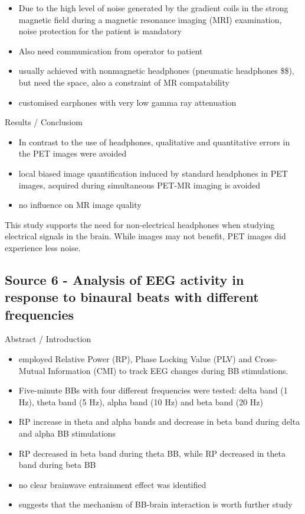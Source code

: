 \documentclass[a4paper]{article}
\begin{document}
\begin{itemize}
    \item Due to the high level of noise generated by the gradient coils in the strong magnetic field during a magnetic resonance imaging (MRI) examination, noise protection for the patient is mandatory
    \item Also need communication from operator to patient
    \item usually achieved with nonmagnetic headphones (pneumatic headphones \$\$), but need the space, also a constraint of MR compatability
    \item customised earphones with very low gamma ray attenuation
\end{itemize}

\noindent
Results / Conclusiom

\begin{itemize}
    \item In contrast to the use of headphones, qualitative and quantitative errors in the PET images were avoided
    \item local biased image quantification induced by standard headphones in PET images, acquired during simultaneous PET-MR imaging is avoided
    \item no influence on MR image quality
\end{itemize}

This study supports the need for non-electrical headphones when studying electrical signals in the brain. While images may not benefit, PET images did experience less noise.

\subsection*{Source 6 - Analysis of EEG activity in response to binaural beats with different frequencies}

\noindent
Abstract / Introduction
\begin{itemize}
    \item employed Relative Power (RP), Phase Locking Value (PLV) and Cross-Mutual Information (CMI) to track EEG changes during BB stimulations.
    \item Five-minute BBs with four different frequencies were tested: delta band (1 Hz), theta band (5 Hz), alpha band (10 Hz) and beta band (20 Hz)
    \item RP increase in theta and alpha bands and decrease in beta band during delta and alpha BB stimulations
    \item RP decreased in beta band during theta BB, while RP decreased in theta band during beta BB
    \item  no clear brainwave entrainment effect was identified
    \item suggests that the mechanism of BB-brain interaction is worth further study
\end{itemize}
\end{document}

